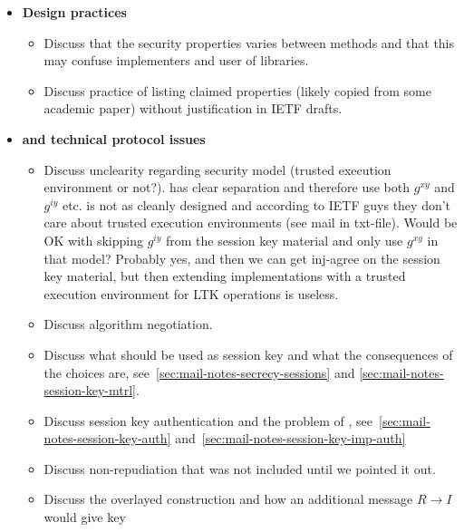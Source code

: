 \documentclass[runningheads]{llncs}
\begin{document}
{\begin{itemize}
        \begin{itemize}
            \item{\textbf{Design practices}}
                \begin{itemize}
                \item Discuss that the security properties varies between methods
                and that this may confuse implementers and user of libraries.
                \item Discuss practice of listing claimed properties (likely copied
                from some academic paper) without justification in IETF drafts.
                \end{itemize}
            \item{\textbf{\mGiy and technical protocol issues}}
                \begin{itemize}
                \item Discuss unclearity regarding security model (trusted execution
                environment or not?). \mOptls has clear separation and therefore
                use both $g^{xy}$ and $g^{iy}$ etc. \mEdhoc is not as cleanly
                designed and according to IETF guys they don't care about
                trusted execution environments (see mail in txt-file).
                Would \mEdhoc be OK with skipping $g^{iy}$ from the session key
                material and only use $g^{xy}$ in that model? Probably yes, and
                then we can get inj-agree on the session key material, but then
                extending \mEdhoc implementations with a trusted execution
                environment for LTK operations is useless.
                \item Discuss algorithm negotiation.
                \item Discuss what should be used as session key and what the
                consequences of the choices are,
                see~\ref{sec:mail-notes-secrecy-sessions} and
                \ref{sec:mail-notes-session-key-mtrl}.
                \item Discuss session key authentication and the problem of \mGiy,
                see~\ref{sec:mail-notes-session-key-auth}
                and~\ref{sec:mail-notes-session-key-imp-auth}
                \item Discuss non-repudiation that was not included until we pointed
                it out.
                \item Discuss the overlayed \mOptls construction and how an
                additional \mOscore message $R \rightarrow I$ would give key

\end{itemize}
\end{itemize}
\end{itemize}}
\end{document}
